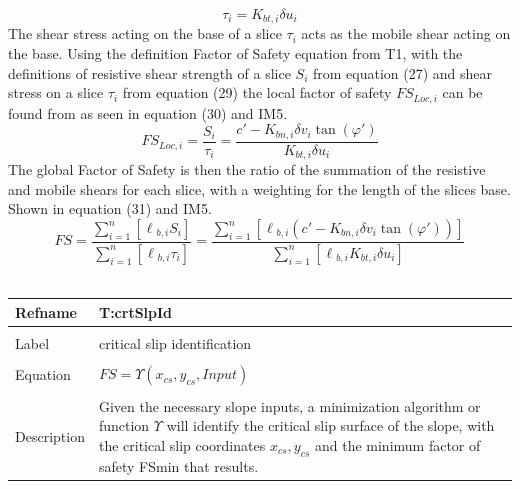 \documentclass[12pt]{article}
\begin{document}
\begin{equation}
\tau{}_{i}=K_{bt,i}\delta{}u_{i}
\end{equation}
The shear stress acting on the base of a slice $\tau{}_{i}$ acts as the mobile shear acting on the base. Using the definition Factor of Safety equation from T1, with the definitions of resistive shear strength of a slice $S_{i}$ from equation (27) and shear stress on a slice $\tau{}_{i}$ from equation (29) the local factor of safety $FS_{Loc,i}$ can be found from as seen in equation (30) and IM5.
\begin{equation}
FS_{Loc,i}=\frac{S_{i}}{\tau{}_{i}}=\frac{c'-K_{bn,i}\delta{}v_{i}\tan\left(\varphi{}'\right)}{K_{bt,i}\delta{}u_{i}}
\end{equation}
The global Factor of Safety is then the ratio of the summation of the resistive and mobile shears for each slice, with a weighting for the length of the slices base. Shown in equation (31) and IM5.
\begin{equation}
FS=\frac{\displaystyle\sum_{i=1}^{n}{\left[\ell{}_{b,i}S_{i}\right]}}{\displaystyle\sum_{i=1}^{n}{\left[\ell{}_{b,i}\tau{}_{i}\right]}}=\frac{\displaystyle\sum_{i=1}^{n}{\left[\ell{}_{b,i}\left(c'-K_{bn,i}\delta{}v_{i}\tan\left(\varphi{}'\right)\right)\right]}}{\displaystyle\sum_{i=1}^{n}{\left[\ell{}_{b,i}K_{bt,i}\delta{}u_{i}\right]}}
\end{equation}
~\newline
\noindent \begin{minipage}{\textwidth}
\begin{tabular}{p{} p{}}
\toprule \textbf{Refname} & \textbf{T:crtSlpId}
\label{T:crtSlpId}
\\ \midrule \\
Label & critical slip identification
\\ \midrule \\
Equation & $FS=\Upsilon{}\left({x_{cs},y_{cs}},Input\right)$
\\ \midrule \\
Description & Given the necessary slope inputs, a minimization algorithm or function $\Upsilon{}$ will identify the critical slip surface of the slope, with the critical slip coordinates ${x_{cs},y_{cs}}$ and the minimum factor of safety FSmin that results.
\\ \bottomrule \end{tabular}
\end{minipage}\\
\end{document}

